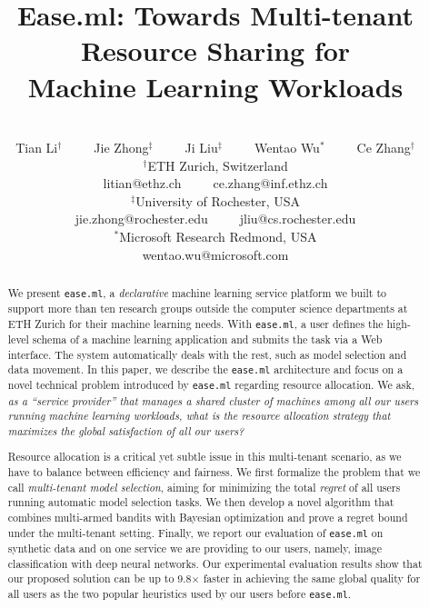 \documentclass[letterpaper]{vldb}
\newcommand{\eml}{\texttt{ease.ml}\xspace}
\begin{document}


\title{Ease.ml: Towards Multi-tenant Resource Sharing for \\
Machine Learning Workloads}

\author{
\vspace{-1.1em}
~\\
Tian Li$^\dagger$~~~~~Jie Zhong$^\ddagger$~~~~~Ji Liu$^\ddagger$~~~~~Wentao Wu$^*$~~~~~Ce Zhang$^\dagger$\\
\small $^\dagger$ETH Zurich, Switzerland\\
\small litian@ethz.ch~~~~~ce.zhang@inf.ethz.ch\\
\small $^\ddagger$University of Rochester, USA\\
\small jie.zhong@rochester.edu~~~~~jliu@cs.rochester.edu\\
\small $^*$Microsoft Research Redmond, USA\\
\small wentao.wu@microsoft.com
}

\maketitle

\begin{abstract}
We present \eml, a \emph{declarative} machine learning service platform we built
to support more than ten research groups outside the computer science departments at ETH Zurich 
for their machine learning needs.
With \eml, a user defines the high-level 
schema of a machine learning application and submits
the task via a Web interface. The system automatically deals with the rest, such as model selection and data movement.
In this paper, we describe the \eml architecture and focus on
a novel technical problem introduced by \eml regarding resource allocation.
We ask, {\em as a ``service provider'' that manages a shared cluster of 
machines among all our users running machine learning workloads, what is the resource
allocation strategy that maximizes the global satisfaction of all
our users?}


Resource allocation is a critical yet subtle issue in this multi-tenant scenario, as we 
have to balance between efficiency and fairness.
We first formalize the problem that we call {\em multi-tenant model selection}, 
aiming for minimizing the total {\em regret} of all users
running automatic model selection tasks.
We then develop a novel algorithm that combines multi-armed bandits with Bayesian 
optimization and prove a regret bound 
under the multi-tenant setting.
Finally, we report our evaluation of \eml on synthetic data and on one service 
we are providing to our users, namely, 
image classification with deep neural networks.
Our experimental evaluation results show that our proposed solution can 
be up to 9.8$\times$ faster in achieving the same global quality
for all users as the %
two popular heuristics used by our users before \eml.

\end{abstract} 
\end{document}
